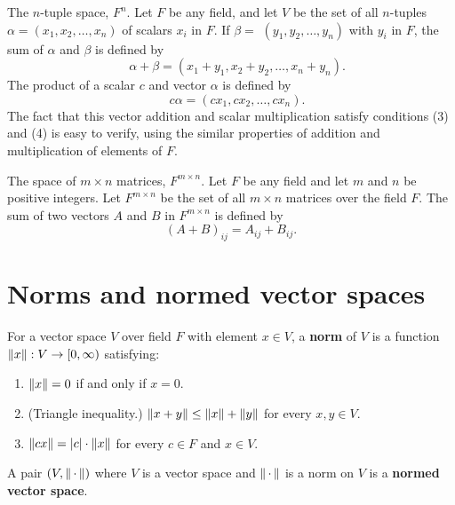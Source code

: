 \documentclass[../main.tex]{subfiles}
\begin{document}
\begin{example}The $n$-tuple space, $F^n$. Let $F$ be any field, and let $V$ be the set of all $n$-tuples $\alpha=\left(x_1, x_2, \ldots, x_n\right)$ of scalars $x_i$ in $F$. If $\beta=$ $\left(y_1, y_2, \ldots, y_n\right)$ with $y_i$ in $F$, the sum of $\alpha$ and $\beta$ is defined by
$$\quad \alpha+\beta=\left(x_1+y_1, x_2+y_2, \ldots, x_n+y_n\right).$$
The product of a scalar $c$ and vector $\alpha$ is defined by
$$\quad c \alpha=\left(c x_1, c x_2, \ldots, c x_n\right).$$
The fact that this vector addition and scalar multiplication satisfy conditions (3) and (4) is easy to verify, using the similar properties of addition and multiplication of elements of $F$.
\end{example}
\begin{example}
The space of $m \times n$ matrices, $F^{m \times n}$. Let $F$ be any field and let $m$ and $n$ be positive integers. Let $F^{m \times n}$ be the set of all $m \times n$ matrices over the field $F$. The sum of two vectors $A$ and $B$ in $F^{m \times n}$ is defined by
$$
(A+B)_{i j}=A_{i j}+B_{i j} .
$$
\end{example}

\section{Norms and normed vector spaces}

\begin{definition}
For a vector space $V$ over field $F$ with element $x \in V$, a \textbf{norm} of $V$ is a function $\norm{x}: V \rightarrow [0,\infty)$ satisfying: 
\begin{enumerate}
    \item $\norm{x} = 0$ if and only if $x = 0$.
    \item (Triangle inequality.) $\norm{x + y} \leq \norm{x} + \norm{y}$ for every $x, y \in V$. 
    \item $\norm{cx} = \abs{c} \cdot \norm{x}$ for every $c \in F$ and $x \in V$. 
\end{enumerate}
\end{definition}


\begin{definition}
A pair $(V, \norm{\,\cdot \,})$ where $V$ is a vector space and $\norm{\, \cdot \,}$ is a norm on $V$ is a \textbf{normed vector space}.
\end{definition}
\end{document}
